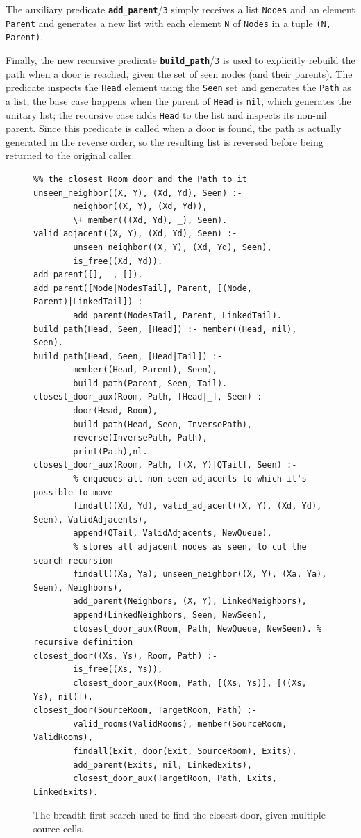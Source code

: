 \documentclass[12pt,a4paper]{article}
\newcommand{\varname}[1]{\texttt{#1}}
\newcommand{\varnamebf}[1]{\textbf{\texttt{#1}}}
\newcommand{\predprot}[2]{{\color{MidnightBlue}\varnamebf{#1}}/{\color{Mulberry}\varname{#2}}}
\begin{document}
The auxiliary predicate \predprot{add\_parent}{3} simply receives a list \varname{Nodes} and an element \varname{Parent} and generates a new list with each element \varname{N} of \varname{Nodes} in a tuple \varname{(N, Parent)}.

Finally, the new recursive predicate \predprot{build\_path}{3} is used to explicitly rebuild the path when a door is reached, given the set of seen nodes (and their parents). The predicate inspects the \varname{Head} element using the \varname{Seen} set and generates the \varname{Path} as a list; the base case happens when the parent of \varname{Head} is \varname{nil}, which generates the unitary list; the recursive case adds \varname{Head} to the list and inspects its non-nil parent. Since this predicate is called when a door is found, the path is actually generated in the reverse order, so the resulting list is reversed before being returned to the original caller.

\begin{figure}[H]
	\centering
\begin{lstlisting}[style=Prolog-pygsty]
%% closest_door((Xs, Ys), Room, Path) - starting at <Xs, Ys>, finds
%% the closest Room door and the Path to it
unseen_neighbor((X, Y), (Xd, Yd), Seen) :-
		neighbor((X, Y), (Xd, Yd)),
		\+ member(((Xd, Yd), _), Seen).
valid_adjacent((X, Y), (Xd, Yd), Seen) :-
		unseen_neighbor((X, Y), (Xd, Yd), Seen),
		is_free((Xd, Yd)).
add_parent([], _, []).
add_parent([Node|NodesTail], Parent, [(Node, Parent)|LinkedTail]) :-
		add_parent(NodesTail, Parent, LinkedTail).
build_path(Head, Seen, [Head]) :- member((Head, nil), Seen).
build_path(Head, Seen, [Head|Tail]) :-
		member((Head, Parent), Seen),
		build_path(Parent, Seen, Tail).
closest_door_aux(Room, Path, [Head|_], Seen) :-
		door(Head, Room),
		build_path(Head, Seen, InversePath),
		reverse(InversePath, Path),
		print(Path),nl.
closest_door_aux(Room, Path, [(X, Y)|QTail], Seen) :-
		% enqueues all non-seen adjacents to which it's possible to move
		findall((Xd, Yd), valid_adjacent((X, Y), (Xd, Yd), Seen), ValidAdjacents),
		append(QTail, ValidAdjacents, NewQueue),
		% stores all adjacent nodes as seen, to cut the search recursion
		findall((Xa, Ya), unseen_neighbor((X, Y), (Xa, Ya), Seen), Neighbors),
		add_parent(Neighbors, (X, Y), LinkedNeighbors),
		append(LinkedNeighbors, Seen, NewSeen),
		closest_door_aux(Room, Path, NewQueue, NewSeen). % recursive definition
closest_door((Xs, Ys), Room, Path) :-
		is_free((Xs, Ys)),
		closest_door_aux(Room, Path, [(Xs, Ys)], [((Xs, Ys), nil)]).
closest_door(SourceRoom, TargetRoom, Path) :-
		valid_rooms(ValidRooms), member(SourceRoom, ValidRooms),
		findall(Exit, door(Exit, SourceRoom), Exits),
		add_parent(Exits, nil, LinkedExits),
		closest_door_aux(TargetRoom, Path, Exits, LinkedExits).
\end{lstlisting}
	\caption{The breadth-first search used to find the closest door, given multiple source cells.} 
	\label{fig:bfs-ms}
\end{figure}
\end{document}
